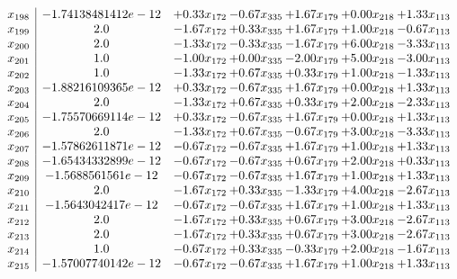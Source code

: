 \documentclass[8pt]{article}
\begin{document}
\[\begin{array}{c| c c@{\hskip 2pt} c@{\hskip 2pt} c@{\hskip 2pt} c@{\hskip 2pt} c@{\hskip 2pt} }
 x_{198}   &  -1.74138481412e-12 & +  0.33 x_{172} & -0.67 x_{335} & +  1.67 x_{179} & +  0.00 x_{218} & +  1.33 x_{113}\\
 x_{199}   &  2.0 & -1.67 x_{172} & +  0.33 x_{335} & +  1.67 x_{179} & +  1.00 x_{218} & -0.67 x_{113}\\
 x_{200}   &  2.0 & -1.33 x_{172} & -0.33 x_{335} & -1.67 x_{179} & +  6.00 x_{218} & -3.33 x_{113}\\
 x_{201}   &  1.0 & -1.00 x_{172} & +  0.00 x_{335} & -2.00 x_{179} & +  5.00 x_{218} & -3.00 x_{113}\\
 x_{202}   &  1.0 & -1.33 x_{172} & +  0.67 x_{335} & +  0.33 x_{179} & +  1.00 x_{218} & -1.33 x_{113}\\
 x_{203}   &  -1.88216109365e-12 & +  0.33 x_{172} & -0.67 x_{335} & +  1.67 x_{179} & +  0.00 x_{218} & +  1.33 x_{113}\\
 x_{204}   &  2.0 & -1.33 x_{172} & +  0.67 x_{335} & +  0.33 x_{179} & +  2.00 x_{218} & -2.33 x_{113}\\
 x_{205}   &  -1.75570669114e-12 & +  0.33 x_{172} & -0.67 x_{335} & +  1.67 x_{179} & +  0.00 x_{218} & +  1.33 x_{113}\\
 x_{206}   &  2.0 & -1.33 x_{172} & +  0.67 x_{335} & -0.67 x_{179} & +  3.00 x_{218} & -3.33 x_{113}\\
 x_{207}   &  -1.57862611871e-12 & -0.67 x_{172} & -0.67 x_{335} & +  1.67 x_{179} & +  1.00 x_{218} & +  1.33 x_{113}\\
 x_{208}   &  -1.65434332899e-12 & -0.67 x_{172} & -0.67 x_{335} & +  0.67 x_{179} & +  2.00 x_{218} & +  0.33 x_{113}\\
 x_{209}   &  -1.5688561561e-12 & -0.67 x_{172} & -0.67 x_{335} & +  1.67 x_{179} & +  1.00 x_{218} & +  1.33 x_{113}\\
 x_{210}   &  2.0 & -1.67 x_{172} & +  0.33 x_{335} & -1.33 x_{179} & +  4.00 x_{218} & -2.67 x_{113}\\
 x_{211}   &  -1.5643042417e-12 & -0.67 x_{172} & -0.67 x_{335} & +  1.67 x_{179} & +  1.00 x_{218} & +  1.33 x_{113}\\
 x_{212}   &  2.0 & -1.67 x_{172} & +  0.33 x_{335} & +  0.67 x_{179} & +  3.00 x_{218} & -2.67 x_{113}\\
 x_{213}   &  2.0 & -1.67 x_{172} & +  0.33 x_{335} & +  0.67 x_{179} & +  3.00 x_{218} & -2.67 x_{113}\\
 x_{214}   &  1.0 & -0.67 x_{172} & +  0.33 x_{335} & -0.33 x_{179} & +  2.00 x_{218} & -1.67 x_{113}\\
 x_{215}   &  -1.57007740142e-12 & -0.67 x_{172} & -0.67 x_{335} & +  1.67 x_{179} & +  1.00 x_{218} & +  1.33 x_{113}\\

\end{array}\]
\end{document}
